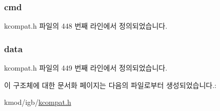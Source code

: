 \subsubsection[{\texorpdfstring{cmd}{cmd}}]{ cmd}\hypertarget{structethtool__value_a62fe2a1dbf17d5a8561a5a7f5a97a9ba}{}\label{structethtool__value_a62fe2a1dbf17d5a8561a5a7f5a97a9ba}


kcompat.\+h 파일의 448 번째 라인에서 정의되었습니다.

\subsubsection[{\texorpdfstring{data}{data}}]{ data}\hypertarget{structethtool__value_a0e5b72ac4f845f11204b39c8fb0f5d91}{}\label{structethtool__value_a0e5b72ac4f845f11204b39c8fb0f5d91}


kcompat.\+h 파일의 449 번째 라인에서 정의되었습니다.



이 구조체에 대한 문서화 페이지는 다음의 파일로부터 생성되었습니다.\+:\begin{DoxyCompactItemize}
\item 
kmod/igb/\hyperlink{kcompat_8h}{kcompat.\+h}\end{DoxyCompactItemize}
